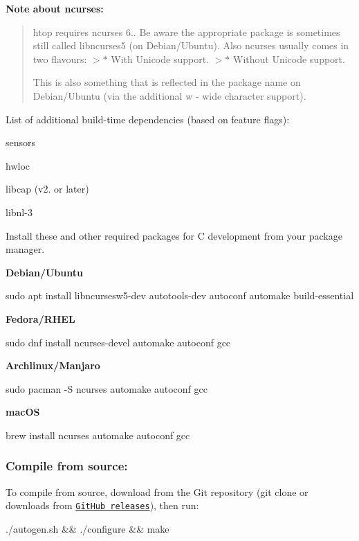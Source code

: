 {\bfseries Note about {\ttfamily ncurses}\+:} \begin{quote}
{\ttfamily htop} requires {\ttfamily ncurses} 6.. Be aware the appropriate package is sometimes still called libncurses5 (on Debian/\+Ubuntu). Also {\ttfamily ncurses} usually comes in two flavours\+: $>$$\ast$ With Unicode support. $>$$\ast$ Without Unicode support.

This is also something that is reflected in the package name on Debian/\+Ubuntu (via the additional \textquotesingle{}w\textquotesingle{} -\/ \textquotesingle{}w\textquotesingle{}ide character support). \end{quote}


List of additional build-\/time dependencies (based on feature flags)\+:
\begin{DoxyItemize}
\item {\ttfamily sensors}
\item {\ttfamily hwloc}
\item {\ttfamily libcap} (v2. or later)
\item {\ttfamily libnl-\/3}
\end{DoxyItemize}

Install these and other required packages for C development from your package manager.

{\bfseries Debian/\+Ubuntu} 
\begin{DoxyCode}
sudo apt install libncursesw5-dev autotools-dev autoconf automake build-essential
\end{DoxyCode}


{\bfseries Fedora/\+R\+H\+EL} 
\begin{DoxyCode}
sudo dnf install ncurses-devel automake autoconf gcc
\end{DoxyCode}


{\bfseries Archlinux/\+Manjaro} 
\begin{DoxyCode}
sudo pacman -S ncurses automake autoconf gcc
\end{DoxyCode}


{\bfseries mac\+OS} 
\begin{DoxyCode}
brew install ncurses automake autoconf gcc
\end{DoxyCode}


\subsubsection*{Compile from source\+:}

To compile from source, download from the Git repository ({\ttfamily git clone} or downloads from \href{https://github.com/htop-dev/htop/releases/}{\tt Git\+Hub releases}), then run\+: 
\begin{DoxyCode}
./autogen.sh && ./configure && make
\end{DoxyCode}


